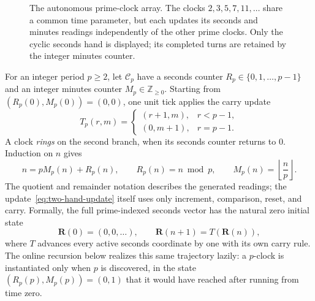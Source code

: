 \documentclass[11pt,a4paper]{article}
\theoremstyle{clockplain}
\theoremstyle{definition}
\theoremstyle{remark}
\begin{document}
\begin{figure}[ht]
\centering
{}
\caption{The autonomous prime-clock array. The clocks $2,3,5,7,11,\ldots$ share a common time parameter, but each updates its seconds and minutes readings independently of the other prime clocks. Only the cyclic seconds hand is displayed; its completed turns are retained by the integer minutes counter.}
\label{fig:autonomous-array}
\end{figure}

For an integer period $p\ge2$, let $\mathcal C_p$ have a seconds counter $R_p\in\{0,1,\ldots,p-1\}$ and an integer minutes counter $M_p\in\mathbb Z_{\ge0}$. Starting from $(R_p(0),M_p(0))=(0,0)$, one unit tick applies the carry update
\begin{equation}
T_p(r,m)=
\begin{cases}
(r+1,m),&r<p-1,\\
(0,m+1),&r=p-1.
\end{cases}
\label{eq:two-hand-update}
\end{equation}
A clock \emph{rings} on the second branch, when its seconds counter returns to $0$. Induction on $n$ gives
\begin{equation}
\boxed{n=pM_p(n)+R_p(n)},
\qquad
R_p(n)=n\bmod p,
\qquad
M_p(n)=\left\lfloor\frac np\right\rfloor.
\label{eq:clock-division}
\end{equation}
The quotient and remainder notation describes the generated readings; the update~\eqref{eq:two-hand-update} itself uses only increment, comparison, reset, and carry. Formally, the full prime-indexed seconds vector has the natural zero initial state
\begin{equation}
\mathbf R(0)=(0,0,\ldots),
\qquad
\mathbf R(n+1)=T(\mathbf R(n)),
\label{eq:seconds-recursion}
\end{equation}
where $T$ advances every active seconds coordinate by one with its own carry rule. The online recursion below realizes this same trajectory lazily: a $p$-clock is instantiated only when $p$ is discovered, in the state $(R_p(p),M_p(p))=(0,1)$ that it would have reached after running from time zero.
\end{document}
